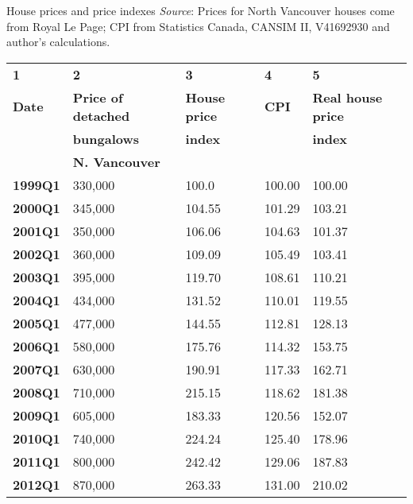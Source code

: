 \begin{Table}{25em}{House prices and price indexes \label{table:housepriceindex}}{\textit{Source}: Prices for North Vancouver houses come from Royal Le Page; CPI from Statistics Canada, CANSIM II, V41692930 and author's calculations.}
\begin{tabu} to \linewidth {|X[0.75,c]X[1.25,c]X[1,c]X[0.5,c]X[1.25,c]|}	\hline
{}	\textbf{1}	&	\textbf{2}	&	\textbf{3}	&	\textbf{4}	&	\textbf{5}	\\
\textbf{Date}	&	\textbf{Price of detached}	&	\textbf{House price}	&	\textbf{CPI}	&	\textbf{Real house price}	\\[-0.5em]
	&	\textbf{bungalows}	&	\textbf{index}	&	&	\textbf{index}	\\[-0.5em]
	&	\textbf{N. Vancouver}	&	&	&	\\
	\textbf{1999Q1} & 330,000 & 100.0 & 100.00 & 100.00 \\
													\textbf{2000Q1} & 345,000 & 104.55 & 101.29 & 103.21 \\
	\textbf{2001Q1} & 350,000 & 106.06 & 104.63 & 101.37 \\
													\textbf{2002Q1} & 360,000 & 109.09 & 105.49 & 103.41 \\
	\textbf{2003Q1} & 395,000 & 119.70 & 108.61 & 110.21 \\
													\textbf{2004Q1} & 434,000 & 131.52 & 110.01 & 119.55 \\
	\textbf{2005Q1} & 477,000 & 144.55 & 112.81 & 128.13 \\ 
													\textbf{2006Q1} & 580,000 & 175.76 & 114.32 & 153.75 \\
	\textbf{2007Q1} & 630,000 & 190.91 & 117.33 & 162.71 \\ 
													\textbf{2008Q1} & 710,000 & 215.15 & 118.62 & 181.38 \\
	\textbf{2009Q1} & 605,000 & 183.33 & 120.56 & 152.07 \\
													\textbf{2010Q1} & 740,000 & 224.24 & 125.40 & 178.96 \\
	\textbf{2011Q1} & 800,000 & 242.42 & 129.06 & 187.83 \\ 
													\textbf{2012Q1} & 870,000 & 263.33 & 131.00 & 210.02 \\ \hline 
\end{tabu}
\end{Table}

